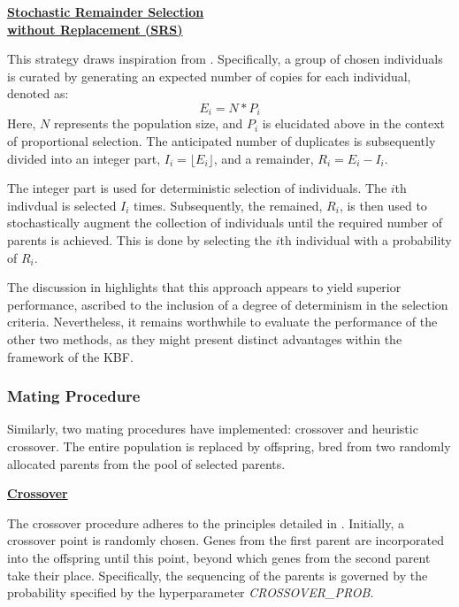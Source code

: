 \documentclass[10pt]{article}
\begin{document}
\begin{multicols}{2}
\textbf{\underline{Stochastic Remainder Selection}}\\\vspace{0.5mm}
\textbf{\underline{\hspace{-0.5mm}without Replacement (SRS)}}

This strategy draws inspiration from \cite{parks2023geneticalgorithms}. Specifically, a group of chosen individuals is curated by generating an expected number of copies for each individual, denoted as: 
\[E_i = N * P_i\]
Here, \(N\) represents the population size, and \(P_i\) is elucidated above in the context of proportional selection. The anticipated number of duplicates is subsequently divided into an integer part, \(I_i = \lfloor E_i \rfloor\), and a remainder, \(R_i = E_i - I_i\). 

The integer part is used for deterministic selection of individuals. The $i$th indivdual is selected $I_i$ times. Subsequently, the remained, $R_i$, is then used to stochastically augment the collection of individuals until the required number of parents is achieved. This is done by selecting the $i$th individual with a probability of $R_i$.

The discussion in \cite{parks2023geneticalgorithms} highlights that this approach appears to yield superior performance, ascribed to the inclusion of a degree of determinism in the selection criteria. Nevertheless, it remains worthwhile to evaluate the performance of the other two methods, as they might present distinct advantages within the framework of the KBF.

\subsubsection{Mating Procedure}

Similarly, two mating procedures have implemented: crossover and heuristic crossover. The entire population is replaced by offspring, bred from two randomly allocated parents from the pool of selected parents.

\textbf{\underline{Crossover}}

The crossover procedure adheres to the principles detailed in \cite{parks2023geneticalgorithms}. Initially, a crossover point is randomly chosen. Genes from the first parent are incorporated into the offspring until this point, beyond which genes from the second parent take their place. Specifically, the sequencing of the parents is governed by the probability specified by the hyperparameter \textit{CROSSOVER\_PROB}.


\end{multicols}
\end{document}
